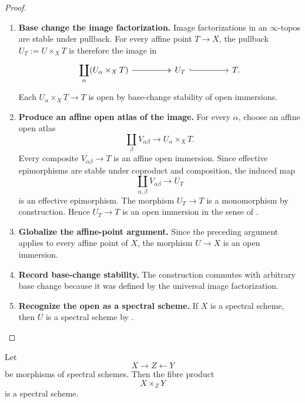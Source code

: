 \begin{proof}
\leavevmode
\begin{enumerate}[label=\textup{(\arabic*)}]
    \item \textbf{Base change the image factorization.}
    Image factorizations in an \(\infty\)-topos are stable under pullback.
    For every affine point \(T\to X\), the pullback \(U_T:=U\times_XT\) is
    therefore the image in
    \[
    \begin{tikzcd}[column sep=huge]
        \displaystyle\coprod_{\alpha}
        (U_\alpha\times_XT)
            \arrow[r, two heads]
        &
        U_T
            \arrow[r, hook]
        &
        T.
    \end{tikzcd}
    \]
    Each \(U_\alpha\times_XT\to T\) is open by base-change stability of open
    immersions.

    \item \textbf{Produce an affine open atlas of the image.}
    For every \(\alpha\), choose an affine open atlas
    \[
        \coprod_\beta V_{\alpha\beta}
        \longrightarrow
        U_\alpha\times_XT.
    \]
    Every composite \(V_{\alpha\beta}\to T\) is an affine open immersion.
    Since effective epimorphisms are stable under coproduct and composition,
    the induced map
    \[
        \coprod_{\alpha,\beta}V_{\alpha\beta}
        \longrightarrow
        U_T
    \]
    is an effective epimorphism. The morphism \(U_T\to T\) is a monomorphism
    by construction. Hence \(U_T\to T\) is an open immersion in the sense of
    .

    \item \textbf{Globalize the affine-point argument.}
    Since the preceding argument applies to every affine point of \(X\), the
    morphism \(U\to X\) is an open immersion.

    \item \textbf{Record base-change stability.}
    The construction commutes with
    arbitrary base change because it was defined by the universal image
    factorization.

    \item \textbf{Recognize the open as a spectral scheme.}
    If \(X\) is a spectral scheme, then \(U\) is a spectral
    scheme by .
\end{enumerate}
\end{proof}

\begin{theorem}
\label{thm:spectral-schemes-fibre-products}
Let
\[
    X\longrightarrow Z\longleftarrow Y
\]
be morphisms of spectral schemes. Then the fibre product
\[
    X\times_ZY
\]
is a spectral scheme.
\end{theorem}

